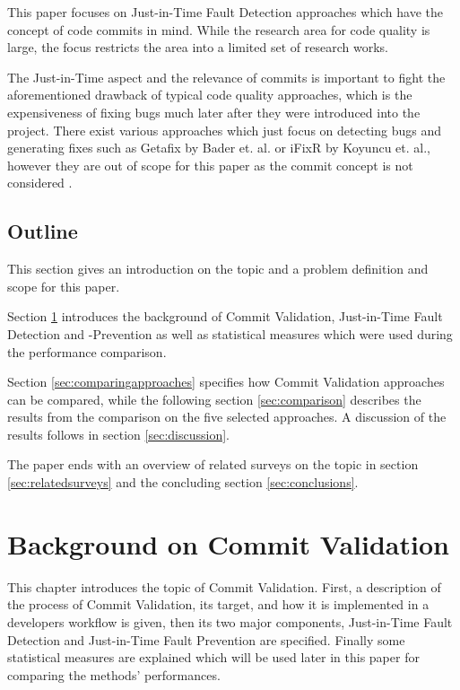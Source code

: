 This paper focuses on Just-in-Time Fault Detection approaches which have the concept of code commits in mind. 
While the research area for code quality is large, the focus restricts the area into a limited set of research works.

The Just-in-Time aspect and the relevance of commits is important to fight the aforementioned drawback of typical code quality approaches, which is the expensiveness of fixing bugs much later after they were introduced into the project. 
There exist various approaches which just focus on detecting bugs and generating fixes such as Getafix by Bader et. al. or iFixR by Koyuncu et. al., however they are out of scope for this paper as the commit concept is not considered \cite{Bader2019,Koyuncu2019}.


\subsection{Outline}
This section gives an introduction on the topic and a problem definition and scope for this paper.

Section \ref{sec:background} introduces the background of Commit Validation, Just-in-Time Fault Detection and -Prevention as well as statistical measures which were used during the performance comparison.

Section \ref{sec:comparingapproaches} specifies how Commit Validation approaches can be compared, while the following section \ref{sec:comparison} describes the results from the comparison on the five selected approaches. A discussion of the results follows in section \ref{sec:discussion}.

The paper ends with an overview of related surveys on the topic in section \ref{sec:relatedsurveys} and the concluding section \ref{sec:conclusions}.



\section{Background on Commit Validation}
\label{sec:background}

This chapter introduces the topic of Commit Validation. 
First, a description of the process of Commit Validation, its target, and how it is implemented in a developers workflow is given, 
then its two major components, Just-in-Time Fault Detection and Just-in-Time Fault Prevention are specified. Finally some statistical measures are explained which will be used later in this paper for comparing the methods' performances.


